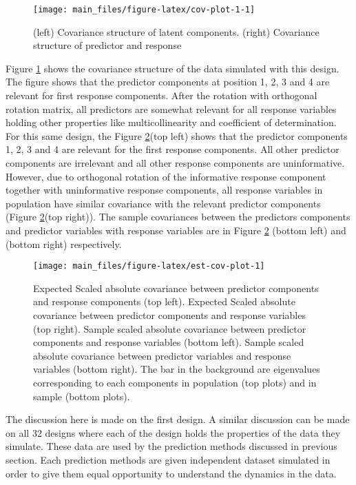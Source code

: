 \documentclass[12pt,3p,authoryear]{elsarticle}
\begin{document}
\begin{figure}
\texttt{[image: main\_files/figure-latex/cov-plot-1-1]} \caption{(left) Covariance structure of latent components. (right) Covariance structure of predictor and response}\label{fig:cov-plot-1}
\end{figure}

Figure \ref{fig:cov-plot-1} shows the covariance structure of the data
simulated with this design. The figure shows that the predictor
components at position 1, 2, 3 and 4 are relevant for first response
components. After the rotation with orthogonal rotation matrix, all
predictors are somewhat relevant for all response variables holding
other properties like multicollinearity and coefficient of
determination. For this same design, the Figure
\ref{fig:est-cov-plot}(top left) shows that the predictor components 1,
2, 3 and 4 are relevant for the first response components. All other
predictor components are irrelevant and all other response components
are uninformative. However, due to orthogonal rotation of the
informative response component together with uninformative response
components, all response variables in population have similar covariance
with the relevant predictor components (Figure
\ref{fig:est-cov-plot}(top right)). The sample covariances between the
predictors components and predictor variables with response variables
are in Figure \ref{fig:est-cov-plot} (bottom left) and (bottom right)
respectively.

\begin{figure}
\texttt{[image: main\_files/figure-latex/est-cov-plot-1]} \caption{Expected Scaled absolute covariance between predictor components and response components (top left). Expected Scaled absolute covariance between predictor components and response variables (top right). Sample scaled absolute covariance between predictor components and response variables (bottom left). Sample scaled absolute covariance between predictor variables and response variables (bottom right). The bar in the background are eigenvalues corresponding to each components in population (top plots) and in sample (bottom plots).}\label{fig:est-cov-plot}
\end{figure}

The discussion here is made on the first design. A similar discussion
can be made on all 32 designs where each of the design holds the
properties of the data they simulate. These data are used by the
prediction methods discussed in previous section. Each prediction
methods are given independent dataset simulated in order to give them
equal opportunity to understand the dynamics in the data.
\end{document}
